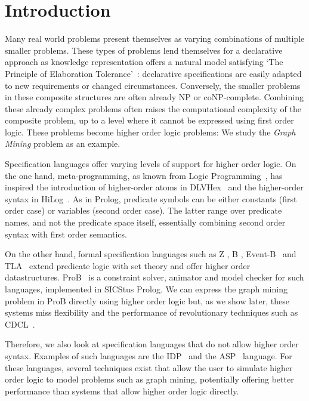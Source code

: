 
\section{Introduction}
Many real world problems present themselves as varying combinations of multiple smaller problems. 
These types of problems lend themselves for a declarative approach as knowledge representation offers a natural model satisfying `The Principle of Elaboration Tolerance'~\citep{elaboration_tolerance}: 
declarative specifications are easily adapted to new requirements or changed circumstances.
Conversely, the smaller problems in these composite structures are often already NP or coNP-complete.
Combining these already complex problems often raises the computational complexity of the composite problem, up to a level where it cannot be expressed using first order logic. 
These problems become higher order logic problems: We study the \emph{Graph Mining} problem as an example.

Specification languages offer varying levels of support for higher order logic.
On the one hand, meta-programming, as known from Logic Programming~\citep{abramson1989meta}, has inspired the introduction of higher-order atoms in DLVHex~\citep{conf/ijcai/EiterIST05}  and the higher-order syntax in HiLog~\citep{chen1993hilog}.
As in Prolog, predicate symbols can be either constants (first order case) or variables (second order case). The latter range over predicate names, and not the predicate space itself, essentially combining second order syntax with first order semantics. 

On the other hand, formal specification languages such as Z \citep{Bowen:Z}, B \citep{Abrial:BBook}, Event-B~\citep{Abrial10} and TLA~\citep{books/aw/Lamport2002}
 extend predicate logic with set theory and offer higher order datastructures. ProB~\citep{journals/sttt/LeuschelB08} is a constraint solver, animator and model checker for such languages, implemented in SICStus Prolog.
We can express the graph mining problem in ProB directly using higher order logic but, as we show later, these systems miss flexibility and the performance of revolutionary techniques such as CDCL~\citep{DBLP:conf/iccad/SilvaS96}.

Therefore, we also look at specification languages that do not allow higher order syntax.
Examples of such languages are the IDP~\citep{WarrenBook/DeCatBBD16} and the ASP~\citep{conf/rweb/EiterIK09,ASPbook} language.
For these languages, several techniques exist that allow the user to simulate higher order logic to model problems such as graph mining, potentially offering better performance than systems that allow higher order logic directly.

